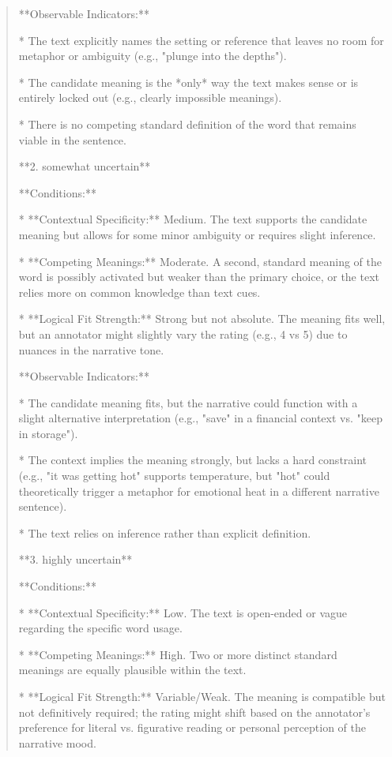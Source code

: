 \begin{quote}
**Observable Indicators:**

*   The text explicitly names the setting or reference that leaves no room for metaphor or ambiguity (e.g., "plunge into the depths").

*   The candidate meaning is the *only* way the text makes sense or is entirely locked out (e.g., clearly impossible meanings).

*   There is no competing standard definition of the word that remains viable in the sentence.



**2. somewhat uncertain**

**Conditions:**

*   **Contextual Specificity:** Medium. The text supports the candidate meaning but allows for some minor ambiguity or requires slight inference.

*   **Competing Meanings:** Moderate. A second, standard meaning of the word is possibly activated but weaker than the primary choice, or the text relies more on common knowledge than text cues.

*   **Logical Fit Strength:** Strong but not absolute. The meaning fits well, but an annotator might slightly vary the rating (e.g., 4 vs 5) due to nuances in the narrative tone.

**Observable Indicators:**

*   The candidate meaning fits, but the narrative could function with a slight alternative interpretation (e.g., "save" in a financial context vs. "keep in storage").

*   The context implies the meaning strongly, but lacks a hard constraint (e.g., "it was getting hot" supports temperature, but "hot" could theoretically trigger a metaphor for emotional heat in a different narrative sentence).

*   The text relies on inference rather than explicit definition.



**3. highly uncertain**

**Conditions:**

*   **Contextual Specificity:** Low. The text is open-ended or vague regarding the specific word usage.

*   **Competing Meanings:** High. Two or more distinct standard meanings are equally plausible within the text.

*   **Logical Fit Strength:** Variable/Weak. The meaning is compatible but not definitively required; the rating might shift based on the annotator's preference for literal vs. figurative reading or personal perception of the narrative mood.


\end{quote}
